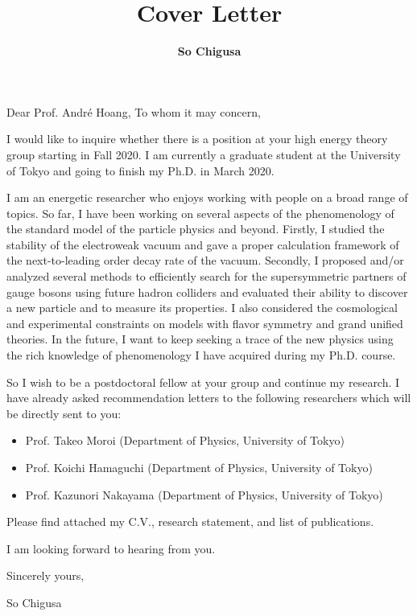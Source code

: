 \documentclass[12pt,notitlepage]{article}
\title{\vspace*{-3cm}Cover Letter}
\author{\textbf{So Chigusa}}
\date{}
\def\professorname{Andr\'{e} Hoang}
\begin{document}
\maketitle
\thispagestyle{empty}

\ifthenelse{\isundefined{\noprofessorname}}
{Dear Prof. \professorname,}
{To whom it may concern,}

\vspace{5mm}
I would like to inquire whether there is a  position at your high energy theory group starting in Fall 2020.
I am currently a graduate student at the University of Tokyo and going to finish my Ph.D. in March 2020.

I am an energetic researcher who enjoys working with people on a broad range of topics.
So far, I have been working on several aspects of the phenomenology of the standard model of the particle physics and beyond.
Firstly, I studied the stability of the electroweak vacuum and gave a proper calculation framework of the next-to-leading order decay rate of the vacuum.
Secondly, I proposed and/or analyzed several methods to efficiently search for the supersymmetric partners of gauge bosons using future hadron colliders and evaluated their ability to discover a new particle and to measure its properties.
I also considered the cosmological and experimental constraints on models with flavor symmetry and grand unified theories.
In the future, I want to keep seeking a trace of the new physics using the rich knowledge of phenomenology I have acquired during my Ph.D. course.

So I wish to be a postdoctoral fellow at your group and continue my research.
I have already asked recommendation letters to the following researchers which will be directly sent to you:
\vspace{-2mm}
\begin{itemize}
  \setlength{\parskip}{1mm}
  \setlength{\itemsep}{0cm}
  \item Prof. Takeo Moroi (Department of Physics, University of Tokyo)
  \item Prof. Koichi Hamaguchi (Department of Physics, University of Tokyo)
  \item Prof. Kazunori Nakayama (Department of Physics, University of Tokyo)
\end{itemize}
\vspace{-2mm}
Please find attached my C.V., research statement, and list of publications.

I am looking forward to hearing from you.

\vspace{5mm}
Sincerely yours,

\vspace{5mm}
So Chigusa
\end{document}
